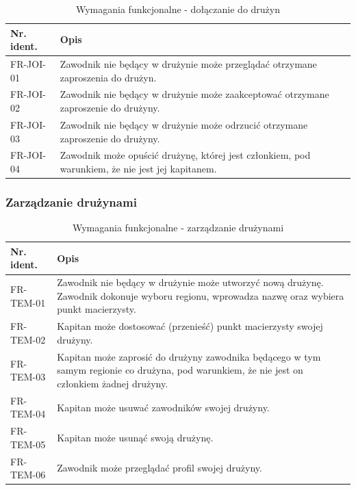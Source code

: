 \begin{table}[H]
\centering\small
\caption{Wymagania funkcjonalne - dołączanie do drużyn}
\label{tab:szablon}
\begin{tabularx}{\linewidth}{|p{.2\linewidth}|X|}\hline
Nr. ident. & Opis \\ \hline\hline

FR-JOI-01 & Zawodnik nie będący w drużynie może przeglądać otrzymane zaproszenia do drużyn.\\ \hline

FR-JOI-02 & Zawodnik nie będący w drużynie może zaakceptować otrzymane zaproszenie do drużyny.\\ \hline

FR-JOI-03 & Zawodnik nie będący w drużynie może odrzucić otrzymane zaproszenie do drużyny.\\ \hline

FR-JOI-04 & Zawodnik może opuścić drużynę, której jest członkiem, pod warunkiem, że nie jest jej kapitanem.\\ \hline

\end{tabularx}
\end{table}


\subsubsection{Zarządzanie drużynami}

\begin{table}[H]
\centering\small
\caption{Wymagania funkcjonalne - zarządzanie drużynami}
\label{tab:szablon}
\begin{tabularx}{\linewidth}{|p{.2\linewidth}|X|}\hline
Nr. ident. & Opis \\ \hline\hline

FR-TEM-01 & Zawodnik nie będący w drużynie może utworzyć nową drużynę. Zawodnik dokonuje wyboru regionu, wprowadza nazwę oraz wybiera punkt macierzysty.\\ \hline

FR-TEM-02 & Kapitan może dostosować (przenieść) punkt macierzysty swojej drużyny.\\ \hline

FR-TEM-03 & Kapitan może zaprosić do drużyny zawodnika będącego w tym samym regionie co drużyna, pod warunkiem, że nie jest on członkiem żadnej drużyny.\\ \hline

FR-TEM-04 & Kapitan może usuwać zawodników swojej drużyny.\\ \hline

FR-TEM-05 & Kapitan może usunąć swoją drużynę.\\ \hline

FR-TEM-06 & Zawodnik może przeglądać profil swojej drużyny.\\ \hline

\end{tabularx}
\end{table}

